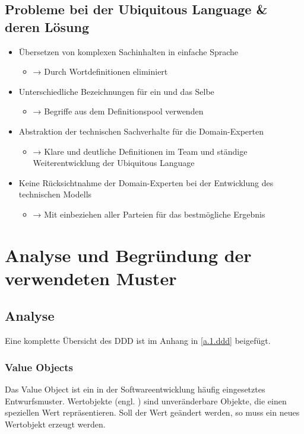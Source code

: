 		\subsection{Probleme bei der Ubiquitous Language \& deren Lösung \cite{ubiquitousLanguage.medium}}
		\begin{itemize}
			\item Übersetzen von komplexen Sachinhalten in einfache Sprache
			\begin{itemize}
				\item[] → Durch Wortdefinitionen eliminiert
			\end{itemize}
			\item Unterschiedliche Bezeichnungen für ein und das Selbe
			\begin{itemize}
				\item[] → Begriffe aus dem Definitionspool verwenden
			\end{itemize}
			\item Abstraktion der technischen Sachverhalte für die Domain-Experten
			\begin{itemize}
				\item[] → Klare und deutliche Definitionen im Team und ständige Weiterentwicklung der Ubiquitous Language
			\end{itemize}
			\item Keine Rücksichtnahme der Domain-Experten bei der Entwicklung des technischen Modells
			\begin{itemize}
				\item[] → Mit einbeziehen aller Parteien für das bestmögliche Ergebnis
			\end{itemize}
		\end{itemize}
	
	\section{Analyse und Begründung der verwendeten Muster}
		
		\subsection{Analyse}
		Eine komplette Übersicht des \acl{DDD} ist im Anhang in \cref{a.1.ddd} beigefügt.
			
			\subsubsection{Value Objects \cite{valueObjects.medium}} \label{1.va}
			Das Value Object ist ein in der Softwareentwicklung häufig eingesetztes Entwurfsmuster. Wertobjekte (engl. ) sind unveränderbare Objekte, die einen speziellen Wert repräsentieren. Soll der Wert geändert werden, so muss ein neues Wertobjekt erzeugt werden.
			
